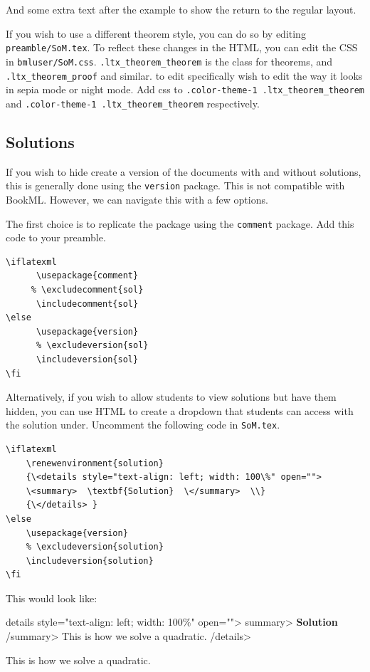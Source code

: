 And some extra text after the example to show the return to the regular layout.

If you wish to use a different theorem style, you can do so by editing \texttt{preamble/SoM.tex}. To reflect these changes in the HTML, you can edit the CSS in \texttt{bmluser/SoM.css}. \verb|.ltx_theorem_theorem| is the class for theorems, and \verb|.ltx_theorem_proof| and similar. to edit specifically wish to edit the way it looks in sepia mode or night mode. Add css to \verb|.color-theme-1 .ltx_theorem_theorem| and \verb|.color-theme-1 .ltx_theorem_theorem| respectively.

\subsection{Solutions}

If you wish to hide create a version of the documents with and without solutions, this is generally done using the \texttt{version} package. This is not compatible with BookML. However, we can navigate this with a few options. 

The first choice is to replicate the package using the \texttt{comment} package. Add this code to your preamble. 

\begin{lstlisting}
\iflatexml 
      \usepackage{comment} 
     % \excludecomment{sol} 
      \includecomment{sol} 
\else 
      \usepackage{version} 
      % \excludeversion{sol} 
      \includeversion{sol} 
\fi 
\end{lstlisting}

Alternatively, if you wish to allow students to view solutions but have them hidden, you can use HTML to create a dropdown that students can access with the solution under. Uncomment the following code in \texttt{SoM.tex}.

\begin{lstlisting}
\iflatexml  
    \renewenvironment{solution} 
    {\<details style="text-align: left; width: 100\%" open="">  
    \<summary>  \textbf{Solution}  \</summary>  \\} 
    {\</details> } 
\else 
    \usepackage{version}  
    % \excludeversion{solution}  
    \includeversion{solution}  
\fi 
\end{lstlisting}

This would look like:

\iflatexml  
\<details style="text-align: left; width: 100\%" open="">  \<summary>  \textbf{Solution}  \</summary>  This is how we solve a quadratic.  
    \</details> 
\else 
    \begin{solution}
        This is how we solve a quadratic. 
    \end{solution} 
\fi 




